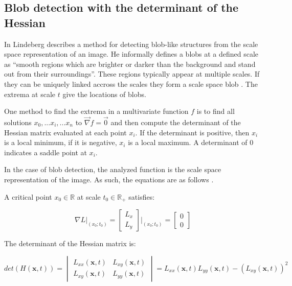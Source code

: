 \subsection{Blob detection with the determinant of the Hessian}
\label{sec:blob_theory}

In \cite{Lindeberg93detectingsalient} Lindeberg describes a method for detecting blob-like structures from the scale space representation of an image. He informally defines a blobs at a defined scale as ``smooth regions which are brighter or darker than the background and stand out from their surroundings''. These regions typically appear at multiple scales. If they can be uniquely linked accross the scales they form a scale space blob \cite{Lindeberg93detectingsalient}. The extrema at scale $t$ give the locations of blobs.

One method to find the extrema in a multivariate function $f$ is to find all solutions $x_0, ... x_i, ... x_n$ to $\vec\nabla f = \vec0$ and then compute the determinant of the Hessian matrix evaluated at each point $x_i$. If the determinant is positive, then $x_i$ is a local minimum, if it is negative, $x_i$ is a local maximum. A determinant of 0 indicates a saddle point at $x_i$.

In the case of blob detection, the analyzed function is the scale space representation of the image. As such, the equations are as follows \cite{Lindeberg93detectingsalient}.

A critical point $x_0 \in \mathbb{R}$ at scale $t_0 \in \mathbb{R}_+$ satisfies:

\begin{equation}
    \nabla L\rvert_{(x_0; t_0)} =
    \begin{bmatrix}
        L_{x} \\ L_{y}
    \end{bmatrix} \Bigg\rvert_{(x_0; t_0)} =
    \begin{bmatrix}
        0 \\ 0
    \end{bmatrix}
\end{equation}

The determinant of the Hessian matrix is:

\begin{equation}
    det(H(\mathbf{x},t)) =
    \begin{vmatrix}
        L_{xx}(\mathbf{x},t) & L_{xy}(\mathbf{x},t) \\
        L_{xy}(\mathbf{x},t) & L_{yy}(\mathbf{x},t)
    \end{vmatrix}
    =
    L_{xx}(\mathbf{x},t) L_{yy}(\mathbf{x},t) - (L_{xy}(\mathbf{x},t))^2
\end{equation}

